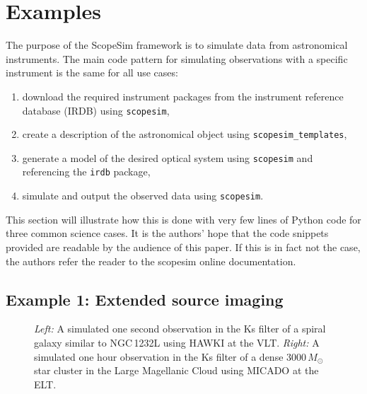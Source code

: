 

\section{Examples}
\label{examples}

The purpose of the ScopeSim framework is to simulate data from
astronomical instruments.  The main code pattern for simulating
observations with a specific instrument is the same for all use cases:

\begin{enumerate}
\item download the required instrument packages from the instrument
  reference database (IRDB) using \lstinline{scopesim},

\item create a description of the astronomical object using
  \lstinline{scopesim_templates},

\item generate a model of the desired optical system using
  \lstinline{scopesim} and referencing the \lstinline{irdb} package,

\item simulate and output the observed data using
  \lstinline{scopesim}.
\end{enumerate}

This section will illustrate how this is done with very few lines of
Python code for three common science cases.  It is the authors' hope
that the code snippets provided are readable by the audience of this
paper.  If this is in fact not the case, the authors refer the reader
to the scopesim online documentation.


\subsection{Example 1: Extended source imaging}
\label{example-1-extended-source-imaging}

\begin{figure}
\caption{\textit{Left:} A simulated one second observation in the Ks filter of
  a spiral galaxy similar to NGC\,1232L using HAWKI at the VLT. \textit{Right:}
  A simulated one hour observation in the Ks filter of a dense
  $3000\, M_{\odot}$ star cluster in the Large Magellanic Cloud using
  MICADO at the ELT.}
\label{fig:combined_1_2}
\end{figure}

